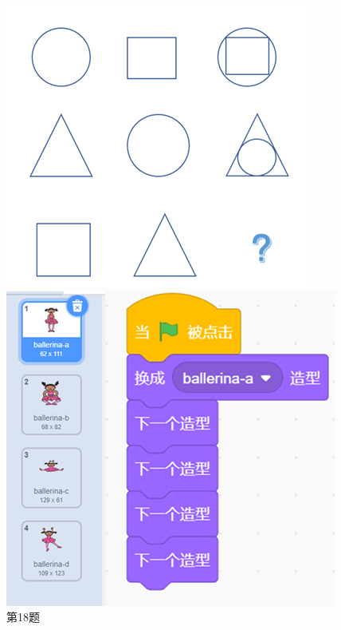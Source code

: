 \documentclass[10pt, a4paper]{article}
\begin{document}
\begin{enumerate}
        \begin{figure}[htbp]
            \centering
            \begin{minipage}[t]{.22\textwidth}
                \centering
                \includegraphics[width=\textwidth]{18.png}
                \caption*{第18题}
            \end{minipage}
            \begin{minipage}[t]{.21\textwidth}
                \centering
                \includegraphics[width=\textwidth]{19.png}

\end{minipage}
\end{figure}
\end{enumerate}
\end{document}
